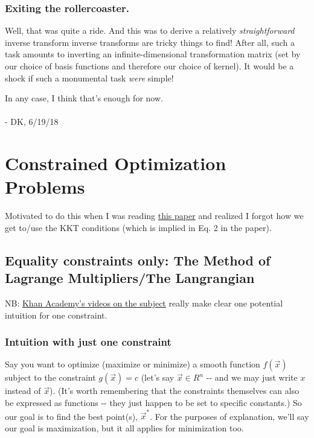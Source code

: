 \documentclass[letterpaper,12pt]{report}
\begin{document}
\subsection{Exiting the rollercoaster.}
Well, that was quite a ride.
And this was to derive a relatively \emph{straightforward}
inverse transform \textemdash{}
inverse transforms are tricky things
to find! After all, such a task amounts to inverting
an infinite-dimensional transformation matrix
(set by our choice of basis functions and therefore our choice
of kernel).
It would be a shock if such a 
monumental task \emph{were} simple!\par

In any case, I think that's enough for now.
\\
\\
- DK, 6/19/18

\newpage

\chapter{Constrained Optimization
Problems}\label{constrained-optimization-problems}

Motivated to do this when I was reading
\href{https://arxiv.org/pdf/1606.05579.pdf}{this paper} and realized I
forgot how we get to/use the KKT conditions (which is implied in Eq. 2
in the paper).

\section{Equality constraints only: The Method of Lagrange
Multipliers/The
Langrangian}\label{equality-constraints-only-the-method-of-lagrange-multipliersthe-langrangian}

NB:
\href{https://www.khanacademy.org/math/multivariable-calculus/applications-of-multivariable-derivatives/lagrange-multipliers-and-constrained-optimization/v/constrained-optimization-introduction}
{Khan
Academy's videos on the subject} really make clear one potential
intuition for one constraint.

\subsection{Intuition with just one
constraint}\label{intuition-with-just-one-constraint}

Say you want to optimize (maximize or minimize) a smooth function
\(f(\vec{x})\) subject to the constraint \(g(\vec{x}) = c\) (let's say
\(\vec{x} \in R^n\) -\/- and we may just write \(x\) instead of
\(\vec{x}\)). (It's worth remembering that the constraints themselves
can also be expressed as functions -\/- they just happen to be set to
specific constants.) So our goal is to find the best point(s),
\({\vec{x}^*}\). For the purposes of explanation, we'll say our goal is
maximization, but it all applies for minimization too.
\end{document}
